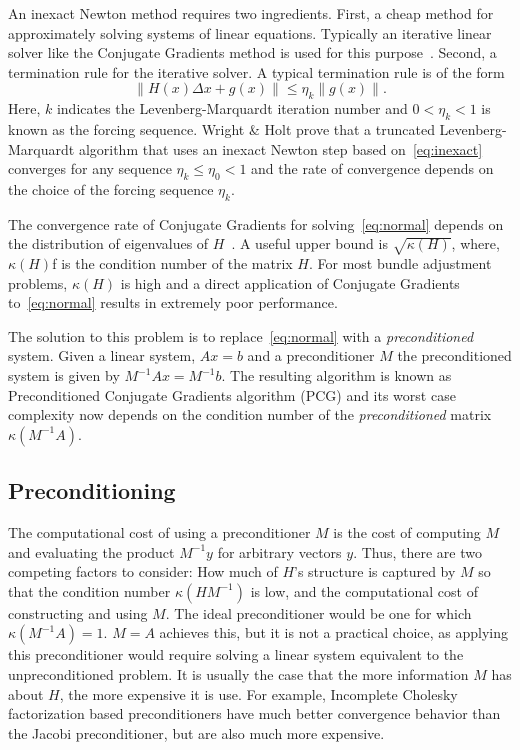 An inexact Newton method requires two ingredients. First, a cheap method for approximately solving systems of linear equations. Typically an iterative linear solver like the Conjugate Gradients method is used for this purpose~\cite{nocedal2000numerical}. Second, a termination rule for the iterative solver. A typical termination rule is of the form
\begin{equation}
        \|H(x) \Delta x + g(x)\| \leq \eta_k \|g(x)\|. \label{eq:inexact}
\end{equation}
Here, $k$ indicates the Levenberg-Marquardt iteration number and $0 < \eta_k <1$ is known as the forcing sequence.  Wright \& Holt \cite{wright1985inexact} prove that a truncated Levenberg-Marquardt algorithm that uses an inexact Newton step based on~\eqref{eq:inexact} converges for any sequence $\eta_k \leq \eta_0 < 1$ and the rate of convergence depends on the choice of the forcing sequence $\eta_k$.


The convergence rate of Conjugate Gradients  for solving~\eqref{eq:normal} depends on the distribution of eigenvalues of $H$~\cite{saad2003iterative}. A useful upper bound is $\sqrt{\kappa(H)}$, where, $\kappa(H)$f is the condition number of the matrix $H$. For most bundle adjustment problems, $\kappa(H)$ is high and a direct application of Conjugate Gradients to~\eqref{eq:normal} results in extremely poor performance.

The solution to this problem is to replace~\eqref{eq:normal} with a {\em preconditioned} system.  Given a linear system, $Ax =b$ and a preconditioner $M$ the preconditioned system is given by $M^{-1}Ax = M^{-1}b$. The resulting algorithm is known as Preconditioned Conjugate Gradients algorithm (PCG) and its  worst case complexity now depends on the condition number of the {\em preconditioned} matrix $\kappa(M^{-1}A)$.

\subsection{Preconditioning}

The computational cost of using a preconditioner $M$ is the cost of computing $M$ and evaluating the product $M^{-1}y$ for arbitrary vectors $y$. Thus, there are two competing factors to consider: How much of $H$'s structure is captured by $M$ so that the condition number $\kappa(HM^{-1})$ is low, and the computational cost of constructing and using $M$.  The ideal preconditioner would be one for which $\kappa(M^{-1}A) =1$. $M=A$ achieves this, but it is not a practical choice, as applying this preconditioner would require solving a linear system equivalent to the unpreconditioned problem.  It is usually the case that the more information $M$ has about $H$, the more expensive it is use. For example, Incomplete Cholesky factorization based preconditioners  have much better convergence behavior than the Jacobi preconditioner, but are also much more expensive.

